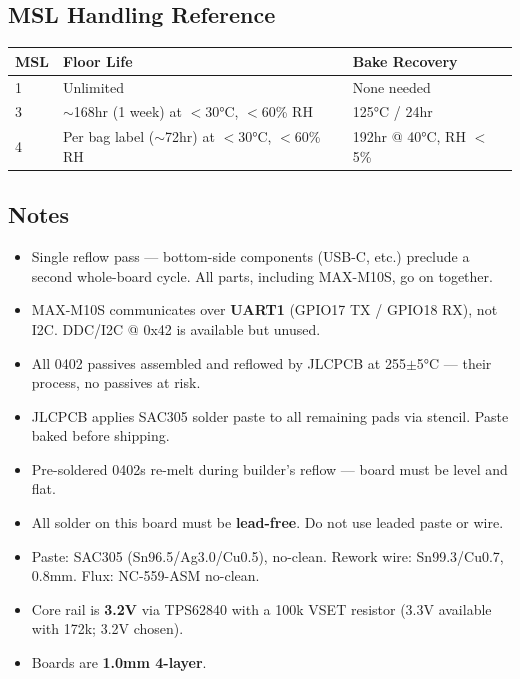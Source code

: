 \documentclass[11pt,a4paper]{article}
\begin{document}
\subsection*{MSL Handling Reference}

\begin{table}[H]
\centering
\begin{tabular}{@{}lll@{}}
\toprule
\textbf{MSL} & \textbf{Floor Life} & \textbf{Bake Recovery} \\
\midrule
1 & Unlimited & None needed \\
3 & $\sim$168hr (1 week) at $<$30°C, $<$60\% RH & 125°C / 24hr \\
4 & Per bag label ($\sim$72hr) at $<$30°C, $<$60\% RH & 192hr @ 40°C, RH $<$5\% \\
\bottomrule
\end{tabular}
\end{table}

\vfill

\subsection*{Notes}
\begin{itemize}[nosep]
\item Single reflow pass — bottom-side components (USB-C, etc.) preclude a second whole-board cycle. All parts, including MAX-M10S, go on together.
\item MAX-M10S communicates over \textbf{UART1} (GPIO17 TX / GPIO18 RX), not I2C. DDC/I2C @ 0x42 is available but unused.
\item All 0402 passives assembled and reflowed by JLCPCB at 255$\pm$5°C — their process, no passives at risk.
\item JLCPCB applies SAC305 solder paste to all remaining pads via stencil. Paste baked before shipping.
\item Pre-soldered 0402s re-melt during builder's reflow — board must be level and flat.
\item All solder on this board must be \textbf{lead-free}. Do not use leaded paste or wire.
\item Paste: SAC305 (Sn96.5/Ag3.0/Cu0.5), no-clean. Rework wire: Sn99.3/Cu0.7, 0.8mm. Flux: NC-559-ASM no-clean.
\item Core rail is \textbf{3.2V} via TPS62840 with a 100k VSET resistor (3.3V available with 172k; 3.2V chosen).
\item Boards are \textbf{1.0mm 4-layer}.
\end{itemize}
\end{document}
